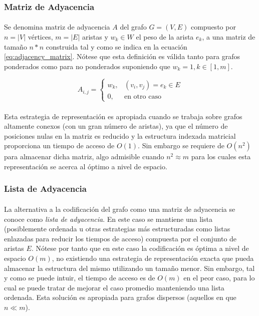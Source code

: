 \documentclass{subfiles}
\begin{document}
        \subsubsection{Matriz de Adyacencia}
        \label{sec:adjacency_matrix}

          \paragraph{}
          Se denomina matriz de adyacencia $A$ del grafo $G = (V,E)$ compuesto por $n=|V|$ vértices, $m=|E|$ aristas y $w_k \in W$ el peso de la arista $e_k$, a una matriz de tamaño $n*n$ construida tal y como se indica en la ecuación \eqref{eq:adjacency_matrix}. Nótese que esta definición es válida tanto para grafos ponderados como para no ponderados suponiendo que $w_k = 1, k \in [1, m]$.

          \begin{equation}
          \label{eq:adjacency_matrix}
            A_{i,j} =
              \begin{cases}
                w_k,  & (v_i, v_j) = e_k \in E\\
                0,    &\text{en otro caso}
              \end{cases}
          \end{equation}

          \paragraph{}
          Esta estrategia de representación es apropiada cuando se trabaja sobre grafos altamente conexos (con un gran número de aristas), ya que el número de posiciones nulas en la matriz es reducido y la estructura indexada matricial proporciona un tiempo de acceso de $O(1)$. Sin embargo se requiere de $O(n^2)$ para almacenar dicha matriz, algo admisible cuando $n^2 \approx m$ para los cuales esta representación se acerca al óptimo a nivel de espacio.

        \subsubsection{Lista de Adyacencia}
        \label{sec:adjacency_list}

          \paragraph{}
          La alternativa a la codificación del grafo como una matriz de adyacencia se conoce como \emph{lista de adyacencia}. En este caso se mantiene una lista (posiblemente ordenada u otras estrategias más estructuradas como listas enlazadas para reducir los tiempos de acceso) compuesta por el conjunto de aristas $E$. Nótese por tanto que en este caso la codificación es óptima a nivel de espacio $O(m)$, no existiendo una estrategia de representación exacta que pueda almacenar la estructura del mismo utilizando un tamaño menor. Sin embargo, tal y como se puede intuir, el tiempo de acceso es de $O(m)$ en el peor caso, para lo cual se puede tratar de mejorar el caso promedio manteniendo una lista ordenada. Esta solución es apropiada para grafos dispersos (aquellos en que $n \ll m$).
\end{document}
